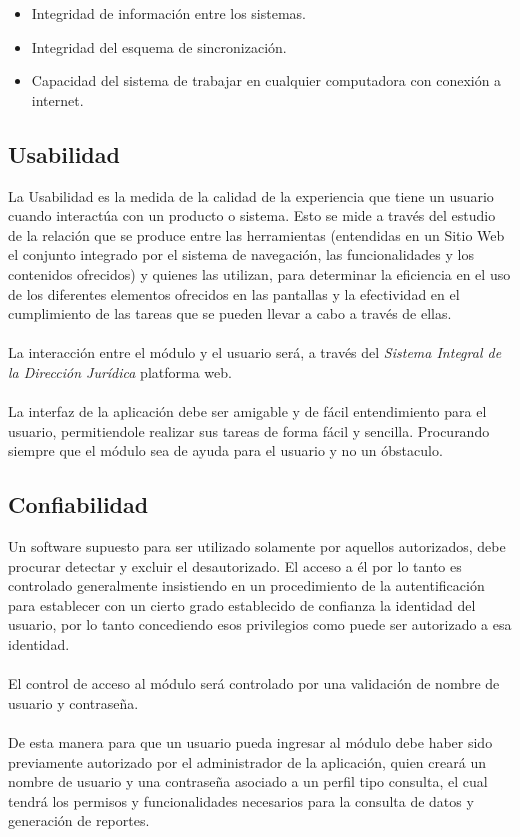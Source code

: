 \documentclass[../reportesINE.tex]{subfiles}
\begin{document}
\begin{itemize}
\item Integridad de información entre los sistemas. \\
\item Integridad del esquema de sincronización. \\
\item Capacidad del sistema de trabajar en cualquier computadora con conexión a internet. \\
\end{itemize}

\subsection{Usabilidad}
La Usabilidad es la medida de la calidad de la experiencia que tiene un usuario cuando interactúa con un producto o sistema. Esto se mide a través del estudio de la relación que se produce entre las herramientas (entendidas en un Sitio Web el conjunto integrado por el sistema de navegación, las funcionalidades y los contenidos ofrecidos) y quienes las utilizan, para determinar la eficiencia en el uso de los diferentes elementos ofrecidos en las pantallas y la efectividad en el cumplimiento de las tareas que se pueden llevar a cabo a través de ellas. \\ \\
La interacción entre el módulo y el usuario será, a través del \textit{Sistema Integral de la Dirección Jurídica} platforma web.  \\ \\
La interfaz de la aplicación debe ser amigable y de fácil entendimiento para el usuario, permitiendole realizar sus tareas de forma fácil y sencilla. Procurando siempre que el módulo sea de ayuda para el usuario y no un óbstaculo.

\subsection{Confiabilidad}
Un software supuesto para ser utilizado solamente por aquellos autorizados, debe procurar detectar y excluir el desautorizado. El acceso a él por lo tanto es controlado generalmente insistiendo en un procedimiento de la autentificación para establecer con un cierto grado establecido de confianza la identidad del usuario, por lo tanto concediendo esos privilegios como puede ser autorizado a esa identidad. \\ \\
El control de acceso al módulo será controlado por una validación de nombre de usuario y contraseña.  \\ \\
De esta manera para que un usuario pueda ingresar al módulo debe haber sido previamente autorizado por el administrador de la aplicación, quien creará un nombre de usuario y una contraseña asociado a un perfil tipo consulta, el cual tendrá los permisos y funcionalidades necesarios para la consulta de datos y generación de reportes.
\end{document}
